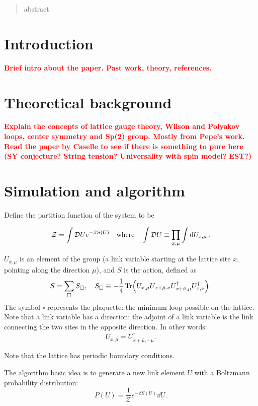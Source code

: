 \documentclass[reqno,12pt]{article}
\title{}
\date{}
\author{}
\numberwithin{equation}{section}
\newcommand{\red}[1]{\textbf{\textcolor{red}{#1}}}
\begin{document}
\begin{abstract}
	abstract
\end{abstract}

\section{Introduction}
\red{Brief intro about the paper. Past work, theory, references.}


\section{Theoretical background}
\red{Explain the concepts of lattice gauge theory, Wilson and Polyakov loops, center symmetry and Sp(2) group. 
Mostly from Pepe's work. Read the paper by Caselle to see if there is something to pure here (SY conjecture? String tension? 
Universality with spin model? EST?)}

\section{Simulation and algorithm}
Define the partition function of the system to be

\begin{equation}
	\mathcal{Z} = \int \mathcal{D}U e^{-\beta S(U)} \qq{where} \int \mathcal{D} U \equiv \prod_{x,\mu} \int \dd{U_{x,\mu}}.
\end{equation}

$U_{x,\mu}$ is an element of the group (a link variable starting at the lattice site $x$, pointing
along the direction $\mu$), 
and $S$ is the action, defined as
\begin{equation}
	S = \sum_\square S_\square \qc 
	S_\square \equiv - \frac{1}{4} \Tr(U_{x,\mu}U_{x+\hat{\mu}, \nu}U^\dagger_{x+\hat{\nu}, \mu}U^\dagger_{x,\nu}).
\end{equation}
The symbol $\square$ represents the plaquette: the minimum loop possible on the lattice. Note that a link 
variable has a direction: the adjoint of a link variable is the link connecting the two sites in the opposite
direction. In other words:
\begin{equation}
	U_{x,\mu} = U_{x+\hat{\mu}, -\mu}^\dagger.
\end{equation}

Note that the lattice has periodic boundary conditions.

The algorithm basic idea is to generate a new link element $U$ with a Boltzmann probability distribution:
\begin{equation}
	P(U) = \frac{1}{\mathcal{Z}} e^{-\beta S(U)} \dd{U}.
\end{equation}  
\end{document}
